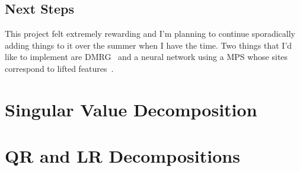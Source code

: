 \documentclass[12pt]{article}
\begin{document}
\begin{multicols}{2}
	\subsection{Next Steps}
	This project felt extremely rewarding and I'm planning to continue
	sporadically adding things to it over the summer when I have the
	time. Two things that I'd like to implement are DMRG~\cite{DMRG}
	and a neural network using a MPS whose sites correspond to lifted
	features~\cite{mps-ml, Huggins}.





\appendix
\section{Singular Value Decomposition}
\section{QR and LR Decompositions}
\end{multicols}
\end{document}
